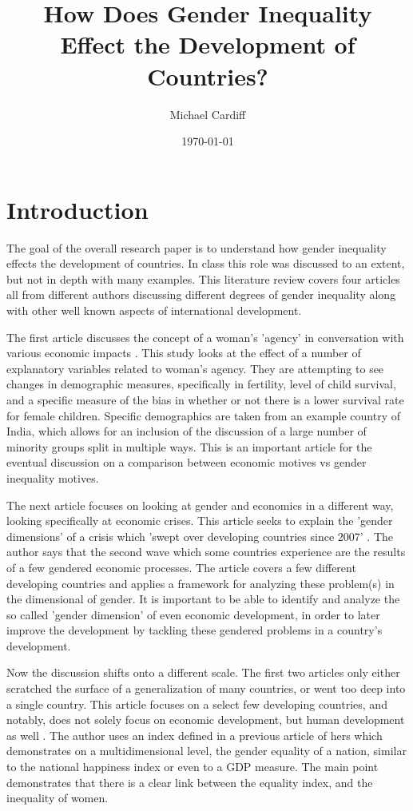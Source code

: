 \documentclass[12pt, letterpaper]{article}
\title{How Does Gender Inequality \\ Effect the Development of Countries?}
\author{Michael Cardiff}
\date{\today}
\begin{document}
\maketitle
\section*{Introduction}
The goal of the overall research paper is to understand how gender inequality effects the development of countries. In class this role was discussed to an extent, but not in depth with many examples. This literature review covers four articles all from different authors discussing different degrees of gender inequality along with other well known aspects of international development.

The first article discusses the concept of a woman's 'agency' in conversation with various economic impacts \cite{bhatt}. This study looks at the effect of a number of explanatory variables related to woman's agency. They are attempting to see changes in demographic measures, specifically in fertility, level of child survival, and a specific measure of the bias in whether or not there is a lower survival rate for female children. Specific demographics are taken from an example country of India, which allows for an inclusion of the discussion of a large number of minority groups split in multiple ways. This is an important article for the eventual discussion on a comparison between economic motives vs gender inequality motives.

The next article focuses on looking at gender and economics in a different way, looking specifically at economic crises. This article seeks to explain the 'gender dimensions' of a crisis which 'swept over developing countries since 2007' \cite{elson}. The author says that the second wave which some countries experience are the results of a few gendered economic processes. The article covers a few different developing countries and applies a framework for analyzing these problem(s) in the dimensional of gender. It is important to be able to identify and analyze the so called 'gender dimension' of even economic development, in order to later improve the development by tackling these gendered problems in a country's development.

Now the discussion shifts onto a different scale. The first two articles only either scratched the surface of a generalization of many countries, or went too deep into a single country. This article focuses on a select few developing countries, and notably, does not solely focus on economic development, but human development as well \cite{ferrant}. The author uses an index defined in a previous article of hers which demonstrates on a multidimensional level, the gender equality of a nation, similar to the national happiness index or even to a GDP measure. The main point demonstrates that there is a clear link between the equality index, and the inequality of women. 
\end{document}
